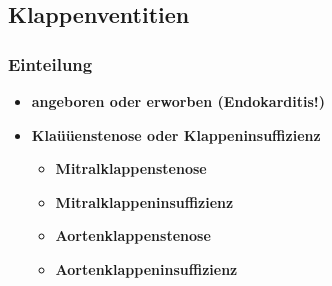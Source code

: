 	\subsection{Klappenventitien}
		\subsubsection{Einteilung}
			\begin{itemize}
				\item \textbf{angeboren oder erworben (Endokarditis!)}
				\item \textbf{Klaüüenstenose oder Klappeninsuffizienz}
					\begin{itemize}
						\item \textbf{Mitralklappenstenose}
						\item \textbf{Mitralklappeninsuffizienz}
						\item \textbf{Aortenklappenstenose}
						\item \textbf{Aortenklappeninsuffizienz} 
					\end{itemize}
			\end{itemize}